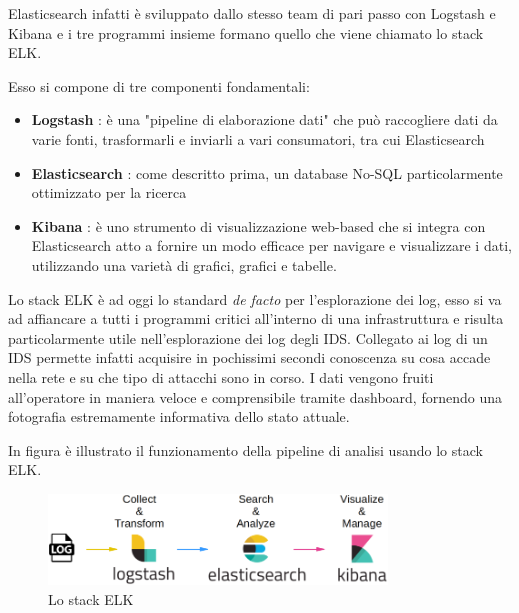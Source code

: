 \documentclass[12pt,a4paper,openright,twoside]{report}
\begin{document}
Elasticsearch infatti \`e sviluppato dallo stesso team di pari passo con Logstash
e Kibana e i tre programmi insieme formano quello che viene chiamato lo stack ELK.

Esso si compone di tre componenti fondamentali:
\begin{itemize}
  \item {\bf Logstash} : \`e una "pipeline di elaborazione dati" che pu\`o raccogliere
  dati da varie fonti, trasformarli e inviarli a vari consumatori, tra cui Elasticsearch
  \item {\bf Elasticsearch} : come descritto prima, un database No-SQL particolarmente ottimizzato per la
  ricerca
  \item {\bf Kibana} : \`e uno strumento di visualizzazione web-based che si integra
  con Elasticsearch atto a fornire un modo efficace per navigare e visualizzare i dati,
  utilizzando una varietà di grafici, grafici e tabelle.
\end{itemize}


Lo stack ELK \`e ad oggi lo standard {\it de facto} per l'esplorazione dei log,
esso si va ad affiancare a tutti i programmi critici all'interno di una infrastruttura
e risulta particolarmente utile nell'esplorazione dei log degli IDS. Collegato ai log di
un IDS permette infatti
acquisire in pochissimi secondi conoscenza su cosa accade nella rete e su che tipo di attacchi
sono in corso. I dati vengono fruiti all'operatore in maniera veloce e comprensibile tramite
dashboard, fornendo una fotografia estremamente informativa dello stato attuale.

In figura \`e illustrato il funzionamento della pipeline di analisi usando lo stack
ELK.

\begin{figure}
  \begin{center}                          %
    \includegraphics[width=90mm]{images/ELK-stack.png}
    \caption{Lo stack ELK}
    \label{}
  \end{center}
\end{figure}


\newpage

\clearpage{\pagestyle{empty}\cleardoublepage}
\end{document}

